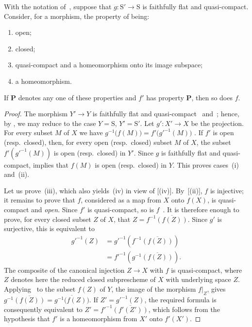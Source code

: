 \begin{proposition}[2.6.2]
\label{IV.2.6.2}
With the notation of~, suppose that
$g:\mathrm{S}'\to\mathrm{S}$ is faithfully flat and quasi-compact.
Consider, for a morphism, the property of being:
\begin{enumerate}
  \item[\textup{(i)}] open;
  \item[\textup{(ii)}] closed;
  \item[\textup{(iii)}] quasi-compact and a homeomorphism onto its image
    subspace;
  \item[\textup{(iv)}] a homeomorphism.
\end{enumerate}
If $\boldsymbol{P}$ denotes any one of these properties and $f'$ has
property $\boldsymbol{P}$, then so does $f$.
\end{proposition}


\begin{proof}
The morphism $Y'\to Y$ is faithfully flat and
quasi-compact~ and~; hence, by
, we may reduce to the case $Y=\mathrm{S}$,
$Y'=\mathrm{S}'$. Let $g':X'\to X$ be the projection. For every subset
$M$ of $X$ we have $g^{-1}\bigl(f(M)\bigr)=f'\bigl(g'^{-1}(M)\bigr)$
. If $f'$ is open \textnormal{(}resp.\ closed\textnormal{)},
then, for every open \textnormal{(}resp.\ closed\textnormal{)} subset
$M$ of $X$, the subset $f'(g'^{-1}(M))$ is open
\textnormal{(}resp.\ closed\textnormal{)} in $Y'$. Since $g$ is
faithfully flat and quasi-compact,  implies that $f(M)$
is open \textnormal{(}resp.\ closed\textnormal{)} in $Y$. This proves
cases~(i) and~(ii).

Let us prove~(iii), which also yields~(iv) in view of
[\textup{(iv)}]. By~[\textup{(ii)}], $f$ is injective; it
remains to prove that $f$, considered as a map from $X$ onto $f(X)$,
is quasi-compact and \emph{open}. Since $f'$ is quasi-compact, so is
$f$~. It is therefore enough to prove, for every closed
subset $Z$ of $X$, that $Z=f^{-1}\overline{(f(Z))}$.
Since $g'$ is surjective, this is equivalent to
\[
\begin{aligned}
  g'^{-1}(Z)
    &=g'^{-1}\!\left(f^{-1}\overline{(f(Z))}\right)\\
    &=f'^{-1}\!\left(g^{-1}\overline{(f(Z))}\right).
\end{aligned}
\]
The composite of the canonical injection $Z\to X$ with $f$ is
quasi-compact, where $Z$ denotes here the reduced closed subprescheme of
$X$ with underlying space $Z$. Applying~ to the subset
$f(Z)$ of $Y$, the image of the morphism $f|_Z$, gives $g^{-1}\overline{(f(Z))}
=
\overline{g^{-1}\bigl(f(Z)\bigr)}$.
If $Z'=g'^{-1}(Z)$, the required formula is consequently equivalent to $Z'=f'^{-1}\overline{(f'(Z'))}$,
which follows from the hypothesis that $f'$ is a homeomorphism from
$X'$ onto $f'(X')$.
\end{proof}

